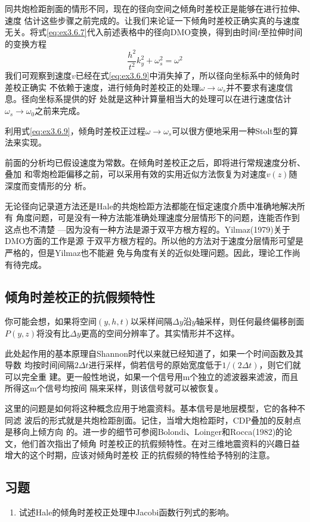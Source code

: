 同共炮检距剖面的情形不同，现在的径向空间之倾角时差校正是能够在进行拉伸、速度
估计这些步骤之前完成的。让我们来论证一下倾角时差校正确实真的与速度无关。将式\ref{eq:ex3.6.7}代入前述表格中的径向DMO变换，得到由时间$t$至拉伸时间的变换方程
\begin{equation}
\frac{h^2}{t^2}k_y^2+\omega_s^2=\omega^2
\label{eq:ex3.6.9}
\end{equation}
我们可观察到速度$v$已经在式\ref{eq:ex3.6.9}中消失掉了，所以径向坐标系中的倾角时差校正确实
不依赖于速度，进行倾角时差校正的处理$\omega\rightarrow\omega_s$并不要求有速度信息。径向坐标系提供的好
处就是这种计算量相当大的处理可以在进行速度估计$\omega_s\rightarrow\omega_0$之前来完成。

利用式\ref{eq:ex3.6.9}，倾角时差校正过程$\omega\rightarrow\omega_s$可以很方便地采用一种Stolt型的算法来实现。

前面的分析均已假设速度为常数。在倾角时差校正之后，即将进行常规速度分析、叠加
和零炮检距偏移之前，可以采用有效的实用近似方法恢复为对速度$v(z)$随深度而变情形的分
析。

无论径向记录道方法还是Hale的共炮检距方法都能在恒定速度介质中准确地解决所有
角度问题，可是没有一种方法能准确处理速度分层情形下的问题，连能否作到这点也不清楚
---因为没有一种方法是源于双平方根方程的。Yilmaz(1979)关于DMO方面的工作是源
于双平方根方程的。所以他的方法对于速度分层情形可望是严格的，但是Yilmaz也不能避
免与角度有关的近似处理问题。因此，理论工作尚有待完成。

\subsection{倾角时差校正的抗假频特性}
\label{sec:3.6.5}

你可能会想，如果将空间$(y,h,t)$以采样间隔$\Delta y$沿$y$轴采样，则任何最终偏移剖面
$P(y,z)$将没有比$\Delta y$更高的空间分辨率了。其实情形并不这样。

此处起作用的基本原理自Shannon时代以来就已经知道了，如果一个时间函数及其导数
均按时间间隔$2\Delta t$进行采样，倘若信号的原始宽度低于$1/(2\Delta t)$，则它们就可以完全重
建。更一般性地说，如果一个信号用m个独立的滤波器来滤波，而且所得这m个信号均按间
隔来采样，则该信号就可以被恢复。

这里的问题是如何将这种概念应用于地震资料。基本信号是地层模型，它的各种不同滤
波后的形式就是共炮检距剖面。记住，当增大炮检距时，CDP叠加的反射点是移向上倾方向
的。进一步的细节可参阅Bolondi、Loinger和Rocca(1982)的论文，他们首次指出了倾角
时差校正的抗假频特性。在对三维地震资料的兴趣日益增大的这个时期，应该对倾角时差校
正的抗假频的特性给予特别的注意。




\subsection{习题}
\label{sec:3.6.6}

\begin{enumerate}
\item 试述Hale的倾角时差校正处理中Jacobi函数行列式的影响。

\end{enumerate}

